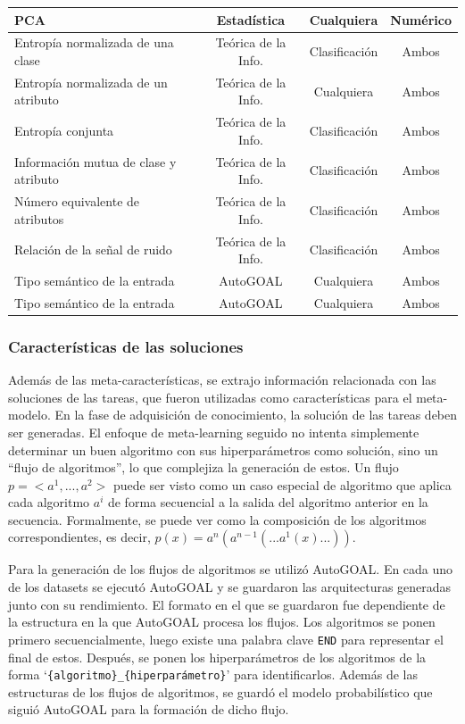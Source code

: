 \begin{center}
\begin{longtable}{l|c|c|c}
		PCA & Estadística & Cualquiera & Numérico \\ \hline 
		Entropía normalizada de una clase & Teórica de la Info. & Clasificación & Ambos \\ 
		Entropía normalizada de un atributo & Teórica de la Info. & Cualquiera & Ambos \\
		Entropía conjunta & Teórica de la Info. & Clasificación & Ambos \\ 
		Información mutua de clase y atributo & Teórica de la Info. & Clasificación & Ambos \\ 
		Número equivalente de atributos & Teórica de la Info. & Clasificación & Ambos \\ 
		Relación de la señal de ruido & Teórica de la Info. & Clasificación & Ambos \\ \hline
		Tipo semántico de la entrada & AutoGOAL & Cualquiera & Ambos \\
		Tipo semántico de la entrada & AutoGOAL & Cualquiera & Ambos \\ \hline
	\end{longtable}
\end{center}

\subsubsection{Características de las soluciones}\label{subsub:soluciones}

Además de las meta-características, se extrajo información relacionada con las soluciones de las tareas, que fueron utilizadas como características para el meta-modelo. En la fase de adquisición de conocimiento, la solución de las tareas deben ser generadas. El enfoque de meta-learning seguido no intenta simplemente determinar un buen algoritmo con sus hiperparámetros como solución, sino un ``flujo de algoritmos'', lo que complejiza la generación de estos. Un flujo $p = <a^1, ..., a^2>$  puede ser visto como un caso especial de algoritmo que aplica cada algoritmo $a^i$ de forma secuencial a la salida del algoritmo anterior en la secuencia. Formalmente, se puede ver como la composición de los algoritmos correspondientes, es decir, $p(x) = a^n(a^{n-1}(...a^1(x)...))$.

Para la generación de los flujos de algoritmos se utilizó AutoGOAL. En cada uno de los datasets se ejecutó AutoGOAL y se guardaron las arquitecturas generadas junto con su rendimiento. El formato en el que se guardaron fue dependiente de la estructura en la que AutoGOAL procesa los flujos. Los algoritmos se ponen primero secuencialmente, luego existe una palabra clave \texttt{END} para representar el final de estos. Después, se ponen los hiperparámetros de los algoritmos de la forma  `\texttt{\{algoritmo\}\_\{hiperparámetro\}}' para identificarlos. Además de las estructuras de los flujos de algoritmos, se guardó el modelo probabilístico que siguió AutoGOAL para la formación de dicho flujo.

